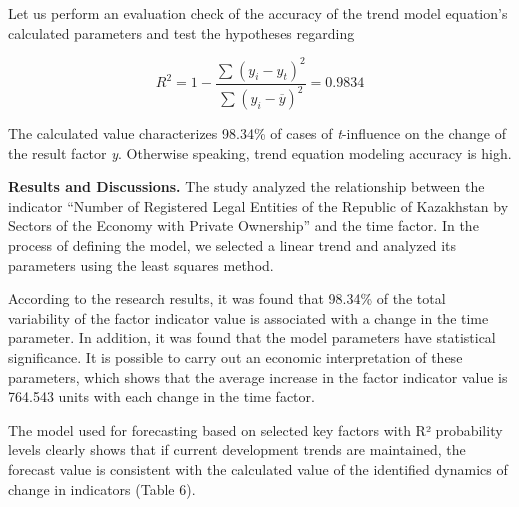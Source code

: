 \begin{multicols}{2}


Let us perform an evaluation check of the accuracy of the trend model
equation's calculated parameters and test the hypotheses regarding

\[R^{2} = 1 - \frac{\sum_{}^{}\left( y_{i} - y_{t} \right)^{2}}{\sum_{}^{}\left( y_{i} - \overline{y} \right)^{2}} = 0.9834\]

The calculated value characterizes 98.34\% of cases of
\emph{t}-influence on the change of the result factor \emph{y}.
Otherwise speaking, trend equation modeling accuracy is high.

{\bfseries Results and Discussions.} The study analyzed the relationship
between the indicator ``Number of Registered Legal Entities of the
Republic of Kazakhstan by Sectors of the Economy with Private
Ownership'' and the time factor. In the process of defining the model,
we selected a linear trend and analyzed its parameters using the least
squares method.

According to the research results, it was found that 98.34\% of the
total variability of the factor indicator value is associated with a
change in the time parameter. In addition, it was found that the model
parameters have statistical significance. It is possible to carry out an
economic interpretation of these parameters, which shows that the
average increase in the factor indicator value is 764.543 units with
each change in the time factor.

The model used for forecasting based on selected key factors with R²
probability levels clearly shows that if current development trends are
maintained, the forecast value is consistent with the calculated value
of the identified dynamics of change in indicators (Table 6).
\end{multicols}

